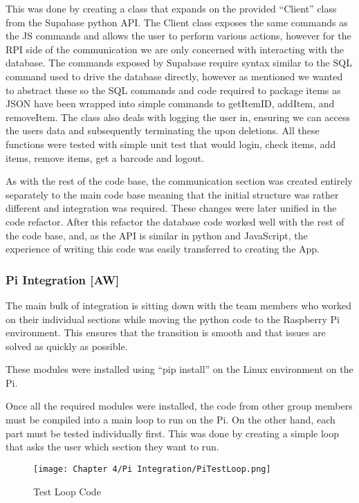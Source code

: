 This was done by creating a class that expands on the provided “Client” class from the Supabase python API.
The Client class exposes the same commands as the JS commands and allows the user to perform various actions, however for the RPI side of the communication we are only concerned with interacting with the database.
The commands exposed by Supabase require syntax similar to the SQL command used to drive the database directly, however as mentioned we wanted to abstract these so the SQL commands and code required to package items as JSON have been wrapped into simple commands to getItemID, addItem, and removeItem.
The class also deals with logging the user in, ensuring we can access the users data and subsequently terminating the upon deletions.
All these functions were tested with simple unit test that would login, check items, add items, remove items, get a barcode and logout.

As with the rest of the code base, the communication section was created entirely separately to the main code base meaning that the initial structure was rather different and integration was required.
These changes were later unified in the code refactor.
After this refactor the database code worked well with the rest of the code base, and, as the API is similar in python and JavaScript, the experience of writing this code was easily transferred to creating the App.

\subsubsection {Pi Integration [AW]}

The main bulk of integration is sitting down with the team members who worked on their individual sections while moving the python code to the Raspberry Pi environment.
This ensures that the transition is smooth and that issues are solved as quickly as possible.



These modules were installed using “pip install” on the Linux environment on the Pi.

Once all the required modules were installed, the code from other group members must be compiled into a main loop to run on the Pi.
On the other hand, each part must be tested individually first.
This was done by creating a simple loop that asks the user which section they want to run.

\begin{figure}[H]        
    \centering
    \texttt{[image: Chapter 4/Pi Integration/PiTestLoop.png]}
    \caption{Test Loop Code}
    \label{fig:tlcode}
\end{figure} 

